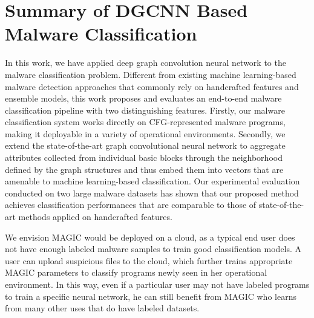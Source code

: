 \section{Summary of DGCNN Based Malware Classification}
\label{MG:Sec:Conclusion}

In this work, we have applied deep graph convolution neural network to the malware classification problem.
Different from existing machine learning-based malware detection approaches that commonly rely on handcrafted features and ensemble models,
this work proposes and evaluates an end-to-end malware classification pipeline with two distinguishing features.
Firstly, our malware classification system works directly on CFG-represented malware programs, making it deployable in a variety of operational environments.
Secondly, we extend the state-of-the-art graph convolutional neural network to aggregate attributes collected from individual basic blocks through the neighborhood defined by the graph structures and thus embed them into vectors that are amenable to machine learning-based classification.
Our experimental evaluation conducted on two large malware datasets has shown that our proposed method achieves classification performances that are comparable to those of state-of-the-art methods applied on handcrafted features.

We envision MAGIC would be deployed on a cloud, as a typical end user does not have enough labeled malware samples to train good classification models.
A user can upload suspicious files to the cloud, which further trains appropriate MAGIC parameters to classify programs newly seen in her operational environment.
In this way, even if a particular user may not have labeled programs to train a specific neural network, he can still benefit from MAGIC who learns from many other uses that do have labeled datasets.


